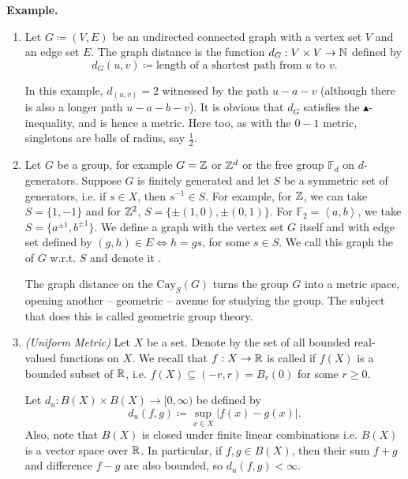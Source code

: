 \documentclass[14pt,oneside]{extarticle}
\newenvironment{example}{
    \par
    \vspace{5pt}
    \noindent\textbf{Example.}
    \begin{tcolorbox}[
        blanker, breakable, left=5mm, parbox=false,
        before upper={\parindent15pt},
        after skip=10pt,
        borderline west={1mm}{0pt}{solarized-magenta!50}]
}{
    \end{tcolorbox}
    \vspace{5pt}
}
\begin{document}
\begin{example}
\begin{enumerate}[label=$\circ$, leftmargin=*, itemsep=1em]

      \item Let $G \coloneqq (V,E)$ be an undirected connected graph with a vertex set $V$ and an edge set $E$. The graph distance is the function $d_G: V \times V\to \mathbb{N}$ defined by
      \[d_G(u,v) \coloneqq \text{length of a shortest path from $u$ to $v$.}\]

      \pic 

      In this example, $d_(u,v) = 2$ witnessed by the path $u-a-v$ (although there is also a longer path $u-a-b-v$). It is obvious that $d_G$ satisfies the $\blacktriangle$-inequality, and is hence a metric. Here too, as with the $0-1$ metric, singletons are balls of radius, say $\frac 1 2$.

      \item Let $G$ be a group, for example $G = \mathbb{Z}$ or $\mathbb{Z}^d$ or the free group $\mathbb{F}_d$ on $d$-generators. Suppose $G$ is finitely generated and let $S$ be a symmetric set of generators, i.e. if $s \in X$, then $s^{-1} \in S$. For example, for $\mathbb{Z}$, we can take $S = \{1, -1 \}$ and for $\mathbb{Z}^2$, $S = \{\pm (1,0), \pm (0,1) \}$. For $\mathbb{F}_2 = \left<a,b\right>$, we take $S = \{a^{\pm 1}, b^{\pm 1}\}$. We define a graph with the vertex set $G$ itself and with edge set defined by $(g,h) \in E \iff h = gs$, for some $s \in S$. We call this graph the  of $G$ w.r.t. $S$ and denote it .
      
      \pic 

      The graph distance on the $\text{Cay}_S(G)$ turns the group $G$ into a metric space, opening another -- geometric -- avenue for studying the group. The subject that does this is called geometric group theory.

      \item \textit{(Uniform Metric)} Let $X$ be a set. Denote by  the set of all bounded real-valued functions on $X$. We recall that $f: X \to \mathbb{R}$ is called  if $f(X)$ is a bounded subset of $\mathbb{R}$, i.e. $f(X) \subseteq (-r, r) = B_r(0)$ for some $r \geq 0$.
      
      Let $d_u: B(X) \times B(X) \to [0, \infty)$ be defined  by 
      \[d_u(f,g) \coloneqq \sup_{x\in X}|f(x) - g(x)|.\]
      Also, note that $B(X)$ is closed under finite linear combinations i.e. $B(X)$ is a vector space over $\mathbb{R}$. In particular, if $f,g \in B(X)$, then their sum $f+g$ and difference $f-g$ are also bounded, so $d_u(f,g) < \infty$.


\end{enumerate}
\end{example}
\end{document}
